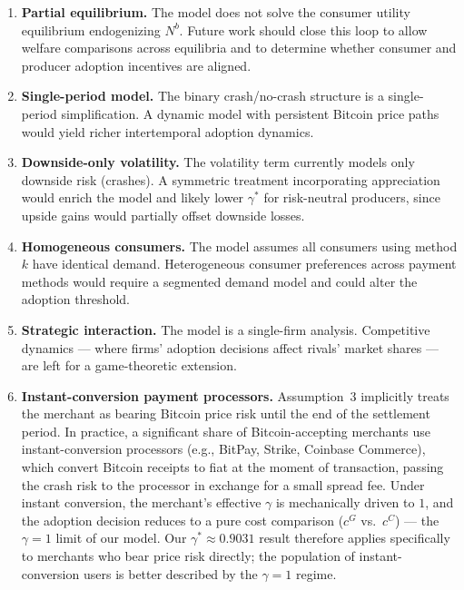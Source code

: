 \documentclass{article}
\begin{document}
\begin{enumerate}
  \item \textbf{Partial equilibrium.}
        The model does not solve the consumer utility equilibrium endogenizing
        $N^b$.
        Future work should close this loop to allow welfare comparisons across
        equilibria and to determine whether consumer and producer adoption
        incentives are aligned.
  \item \textbf{Single-period model.}
        The binary crash/no-crash structure is a single-period simplification.
        A dynamic model with persistent Bitcoin price paths would yield richer
        intertemporal adoption dynamics.
  \item \textbf{Downside-only volatility.}
        The volatility term currently models only downside risk (crashes).
        A symmetric treatment incorporating appreciation would enrich the model
        and likely lower $\gamma^*$ for risk-neutral producers, since upside
        gains would partially offset downside losses.
  \item \textbf{Homogeneous consumers.}
        The model assumes all consumers using method $k$ have identical demand.
        Heterogeneous consumer preferences across payment methods would require
        a segmented demand model and could alter the adoption threshold.
  \item \textbf{Strategic interaction.}
        The model is a single-firm analysis.
        Competitive dynamics --- where firms' adoption decisions affect rivals'
        market shares --- are left for a game-theoretic extension.
  \item \textbf{Instant-conversion payment processors.}
        Assumption~3 implicitly treats the merchant as bearing Bitcoin price
        risk until the end of the settlement period.
        In practice, a significant share of Bitcoin-accepting merchants use
        instant-conversion processors (e.g., BitPay, Strike, Coinbase Commerce),
        which convert Bitcoin receipts to fiat at the moment of transaction,
        passing the crash risk to the processor in exchange for a small spread
        fee.
        Under instant conversion, the merchant's effective $\gamma$ is
        mechanically driven to $1$, and the adoption decision reduces to a pure
        cost comparison ($c^G$ vs.\ $c^C$) --- the $\gamma = 1$ limit of our
        model.
        Our $\gamma^* \approx 0.9031$ result therefore applies specifically to
        merchants who bear price risk directly; the population of instant-conversion
        users is better described by the $\gamma = 1$ regime.
\end{enumerate}
\end{document}

